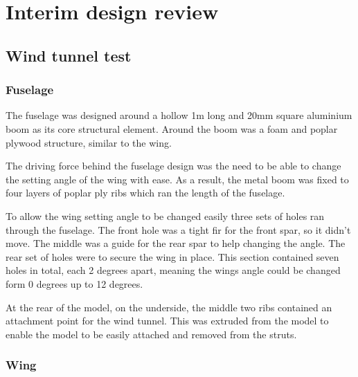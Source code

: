 \documentclass[../../main.tex]{subfiles}
\begin{document}
\section{Interim design review} \label{sec:design-process:interim-design-review}

\subsection{Wind tunnel test} \label{sec:design-process:interim-design-review:wind-tunnel-test}

\subsubsection{Fuselage} \label{sec:design-process:interim-design-review:wind-tunnel-test:fuselage}

The fuselage was designed around a hollow 1m long and 20mm square aluminium boom as its core structural element.
Around the boom was a foam and poplar plywood structure, similar to the wing. 

The driving force behind the fuselage design was the need to be able to change the setting angle of the wing with ease.
As a result, the metal boom was fixed to four layers of poplar ply ribs which ran the length of the fuselage. 

To allow the wing setting angle to be changed easily three sets of holes ran through the fuselage.
The front hole was a tight fir for the front spar, so it didn’t move.
The middle was a guide for the rear spar to help changing the angle.
The rear set of holes were to secure the wing in place.
This section contained seven holes in total, each 2 degrees apart, meaning the wings angle could be changed form 0 degrees up to 12 degrees. 


At the rear of the model, on the underside, the middle two ribs contained an attachment point for the wind tunnel.
This was extruded from the model to enable the model to be easily attached and removed from the struts. 


\subsubsection{Wing} \label{sec:design-process:interim-design-review:wind-tunnel-test:wing}
\end{document}
